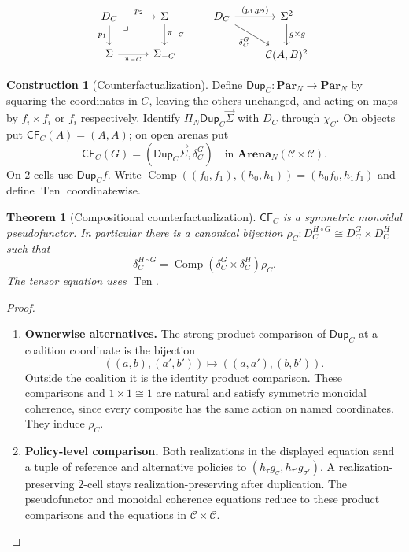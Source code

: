 \documentclass[11pt,a4paper]{article}
\numberwithin{equation}{section}
\newtheorem{theorem}{Theorem}[section]
\theoremstyle{definition}
\newtheorem{construction}[construction]{Construction}
\theoremstyle{remark}
\theoremstyle{plain}
\begin{document}
\[
\begin{tikzcd}
 D_C\arrow[r,"p_2"]\arrow[d,"p_1"']
 \arrow[dr,phantom,"\lrcorner",very near start]&\Sigma\arrow[d,"\pi_{-C}"]\\
 \Sigma\arrow[r,"\pi_{-C}"']&\Sigma_{-C}
\end{tikzcd}
\qquad
\begin{tikzcd}
 D_C\arrow[r,"{(p_1,p_2)}"]\arrow[dr,"\delta_C^G"']&
 \Sigma^2\arrow[d,"g\times g"]\\
 &\mathcal C(A,B)^2
\end{tikzcd}
\]

\begin{construction}[Counterfactualization]
Define $\mathsf{Dup}_C:\mathbf{Par}_N\to\mathbf{Par}_N$ by squaring the
coordinates in $C$, leaving the others unchanged, and acting on maps by
$f_i\times f_i$ or $f_i$ respectively. Identify
$\Pi_N\mathsf{Dup}_C\vec\Sigma$ with $D_C$ through $\chi_C$.
On objects put $\mathsf{CF}_C(A)=(A,A)$; on open arenas put
\[
 \mathsf{CF}_C(G)=(\mathsf{Dup}_C\vec\Sigma,\delta_C^G)
 \quad\text{in }\mathbf{Arena}_N(\mathcal C\times\mathcal C).
\]
On $2$-cells use $\mathsf{Dup}_Cf$.
Write $\operatorname{Comp}((f_0,f_1),(h_0,h_1))
=(h_0f_0,h_1f_1)$ and define $\operatorname{Ten}$ coordinatewise.
\end{construction}

\begin{theorem}[Compositional counterfactualization]
\label{thm:egt-counterfactual}\label{prop:egt-composite-deviation}
$\mathsf{CF}_C$ is a symmetric monoidal pseudofunctor. In particular there
is a canonical bijection
$\rho_C:D_C^{H\circ G}\cong D_C^G\times D_C^H$ such that
\begin{equation}\label{eq:egt-counterfactual-composition}
 \delta_C^{H\circ G}
 =\operatorname{Comp}(\delta_C^G\times\delta_C^H)\rho_C.
\end{equation}
The tensor equation uses $\operatorname{Ten}$.
\end{theorem}
\begin{proof}
\leavevmode
\begin{enumerate}[label=\textup{(\arabic*)},leftmargin=*,itemsep=4pt,topsep=3pt]
  \item \textbf{Ownerwise alternatives.} The strong product comparison of $\mathsf{Dup}_C$ at a coalition coordinate
is the bijection
\[
 ((a,b),(a',b'))\longmapsto((a,a'),(b,b')).
\]
Outside the coalition it is the identity product comparison. These comparisons and $1\times1\cong1$ are
natural and satisfy symmetric monoidal coherence, since every composite
has the same action on named coordinates. They induce $\rho_C$.
  \item \textbf{Policy-level comparison.} Both realizations in the displayed equation send a tuple of reference and
alternative policies to
$(h_\tau g_\sigma,h_{\tau'}g_{\sigma'})$. A realization-preserving
$2$-cell stays realization-preserving after duplication. The pseudofunctor
and monoidal coherence equations reduce to these product comparisons and
the equations in $\mathcal C\times\mathcal C$.
\end{enumerate}
\end{proof}
\end{document}
